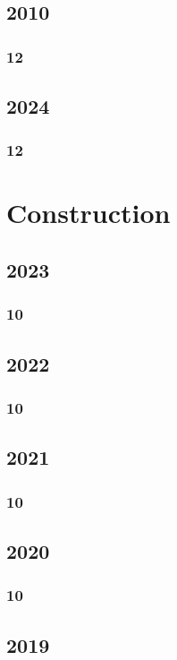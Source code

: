 \documentclass[11pt]{book}
\begin{document}
\section{2010}
\subsection{12}


\section{2024}
\subsection{12}


\chapter{Construction}
\section{2023}
\subsection{10}

\section{2022}
\subsection{10}

\section{2021}
\subsection{10}

\section{2020}
\subsection{10}

\section{2019} 
\end{document}

